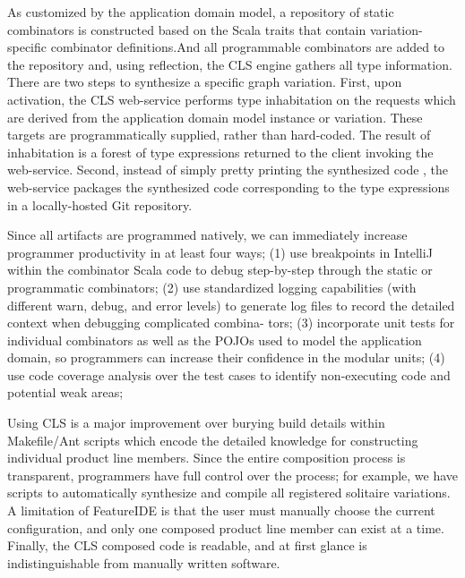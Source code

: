  As customized by the application domain model, a repository of static combinators is constructed
 based on the Scala traits that contain variation-specific combinator definitions.And all programmable combinators
 are added to the repository and, using reflection, the CLS engine gathers all type information.
 There are two steps to synthesize a specific graph variation. First, upon activation, the CLS web-service
 performs type inhabitation on the requests which are derived from the application domain model instance or variation.
  These targets are programmatically supplied, rather than hard-coded.
  The result of inhabitation is a forest of type expressions returned to
 the client invoking the web-service. Second, instead of simply pretty printing the synthesized code
 , the web-service packages the synthesized code corresponding to the type
 expressions in a locally-hosted Git repository.

 Since all artifacts are programmed natively, we can immediately increase programmer
 productivity in at least four ways; (1) use breakpoints in IntelliJ within the combinator Scala code to debug
 step-by-step through the static or programmatic combinators; (2) use standardized logging capabilities
 (with different warn, debug, and error levels) to generate log files to record the detailed context when debugging
 complicated combina- tors; (3) incorporate unit tests for individual combinators as well as the POJOs used to
 model the application domain, so programmers can increase their confidence in the modular units; (4) use code
 coverage analysis over the test cases to identify non-executing code and potential weak areas;

 Using CLS is a major improvement over burying build details within Makefile/Ant scripts which encode the detailed
 knowledge for constructing individual product line members. Since the entire composition process is transparent,
 programmers have full control over the process; for example, we have scripts to automatically synthesize and
 compile all registered solitaire variations.
 A limitation of FeatureIDE is that the user must manually choose the current configuration, and only one composed
 product line member can exist at a time. Finally, the CLS composed code is readable, and at first glance is
 indistinguishable from manually written software.